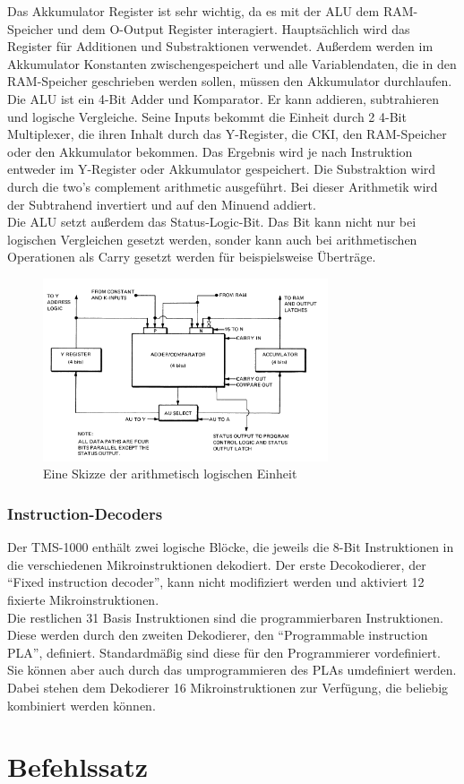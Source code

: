 Das Akkumulator Register ist sehr wichtig, da es mit der ALU dem RAM-Speicher und dem O-Output Register interagiert. Haupts{\"a}chlich wird das Register f{\"u}r Additionen und Substraktionen verwendet. Au{\ss}erdem werden im Akkumulator Konstanten zwischengespeichert und alle Variablendaten, die in den RAM-Speicher geschrieben werden sollen, m{\"u}ssen den Akkumulator durchlaufen. \\
Die ALU ist ein 4-Bit Adder und Komparator. Er kann addieren, subtrahieren und logische Vergleiche. Seine Inputs bekommt die Einheit durch 2 4-Bit Multiplexer, die ihren Inhalt durch das Y-Register, die CKI, den RAM-Speicher oder den Akkumulator bekommen. Das Ergebnis wird je nach Instruktion entweder im Y-Register oder Akkumulator gespeichert. Die Substraktion wird durch die two's complement arithmetic ausgef{\"u}hrt. Bei dieser Arithmetik wird der Subtrahend invertiert und auf den Minuend addiert. \\
Die ALU setzt au{\ss}erdem das Status-Logic-Bit. Das Bit kann nicht nur bei logischen Vergleichen gesetzt werden, sonder kann auch bei arithmetischen Operationen als Carry gesetzt werden f{\"u}r beispielsweise {\"U}bertr{\"a}ge.
\\

\begin{figure}[!htb]
	\centering
		\includegraphics[width=0.75\textwidth]{figures/ALU_TMS1000.PNG}
	\caption{Eine Skizze der arithmetisch logischen Einheit}
	\label{fig:ALU_TMS1000}
\end{figure}

\subsubsection{Instruction-Decoders}

Der TMS-1000 enth{\"a}lt zwei logische Bl{\"o}cke, die jeweils die 8-Bit Instruktionen in die verschiedenen Mikroinstruktionen dekodiert. Der erste Decokodierer, der "`Fixed instruction decoder"', kann nicht modifiziert werden und aktiviert 12 fixierte Mikroinstruktionen. \\
Die restlichen 31 Basis Instruktionen sind die programmierbaren Instruktionen. Diese werden durch den zweiten Dekodierer, den "`Programmable instruction PLA"', definiert. Standardm{\"a}{\ss}ig sind diese f{\"u}r den Programmierer vordefiniert. Sie k{\"o}nnen aber auch durch das umprogrammieren des PLAs umdefiniert werden. Dabei stehen dem Dekodierer 16 Mikroinstruktionen zur Verf{\"u}gung, die beliebig kombiniert werden k{\"o}nnen.

\section{Befehlssatz}







